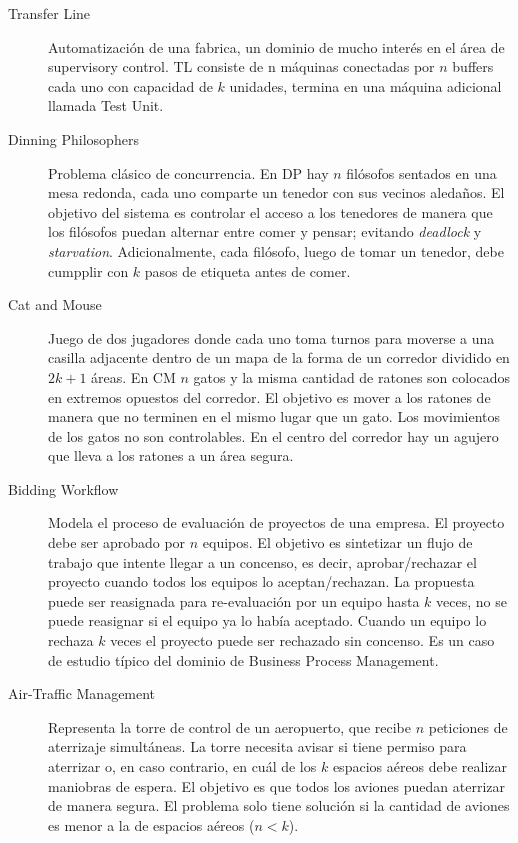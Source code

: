\begin{description}
    \item [Transfer Line] Automatización de una fabrica, un dominio de mucho interés en el área de supervisory control. TL consiste de n máquinas conectadas por $n$ buffers cada uno con capacidad de $k$ unidades, termina en una máquina adicional llamada Test Unit.
    
    \item [Dinning Philosophers] Problema clásico de concurrencia. En DP hay $n$ filósofos sentados en una mesa redonda, cada uno comparte un tenedor con sus vecinos aledaños. El objetivo del sistema es controlar el acceso a los tenedores de manera que los filósofos puedan alternar entre comer y pensar; evitando \textit{deadlock} y \textit{starvation}. Adicionalmente, cada filósofo, luego de tomar un tenedor, debe cumpplir con $k$ pasos de etiqueta antes de comer.

    \item [Cat and Mouse] Juego de dos jugadores donde cada uno toma turnos para moverse a una casilla adjacente dentro de un mapa de la forma de un corredor dividido en $2k + 1$ áreas. En CM $n$ gatos y la misma cantidad de ratones son colocados en extremos opuestos del corredor. El objetivo es mover a los ratones de manera que no terminen en el mismo lugar que un gato. Los movimientos de los gatos no son controlables. En el centro del corredor hay un agujero que lleva a los ratones a un área segura.
    
    \item [Bidding Workflow] Modela el proceso de evaluación de proyectos de una empresa. El proyecto debe ser aprobado por $n$ equipos. El objetivo es sintetizar un flujo de trabajo que intente llegar a un concenso, es decir, aprobar/rechazar el proyecto cuando todos los equipos lo aceptan/rechazan. La propuesta puede ser reasignada para re-evaluación por un equipo hasta $k$ veces, no se puede reasignar si el equipo ya lo había aceptado. Cuando un equipo lo rechaza $k$ veces el proyecto puede ser rechazado sin concenso. Es un caso de estudio típico del dominio de Business Process Management.
    
    \item [Air-Traffic Management] Representa la torre de control de un aeropuerto, que recibe $n$ peticiones de aterrizaje simultáneas. La torre necesita avisar si tiene permiso para aterrizar o, en caso contrario, en cuál de los $k$ espacios aéreos debe realizar maniobras de espera. El objetivo es que todos los aviones puedan aterrizar de manera segura. El problema solo tiene solución si la cantidad de aviones es menor a la de espacios aéreos ($n<k$).
    

\end{description}
